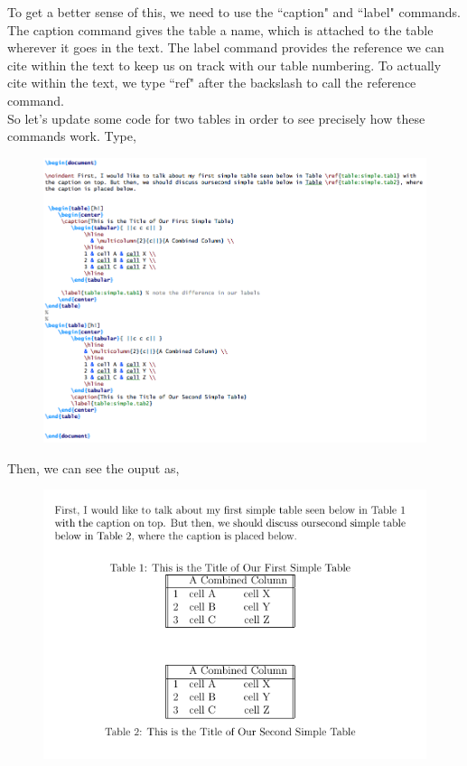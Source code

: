 \documentclass[11pt]{article}
\begin{document}
To get a better sense of this, we need to use the ``caption" and ``label" commands. The caption command gives the table a name, which is attached to the table wherever it goes in the text. The label command provides the reference we can cite within the text to keep us on track with our table numbering. To actually cite within the text, we type ``ref" after the backslash to call the reference command. \\

So let's update some code for two tables in order to see precisely how these commands work. Type,

\begin{figure}[!h]
	\includegraphics[scale=.5]{CODE7} \\ %
\end{figure}

\newpage

Then, we can see the ouput as,

\begin{figure}[!h]
	\includegraphics[scale=.6]{OUT7} \\ %
	\centering
\end{figure}
\end{document}
